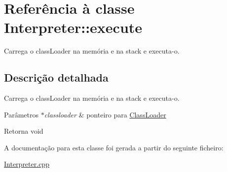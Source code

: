 \hypertarget{class_interpreter_1_1execute}{}\section{Referência à classe Interpreter\+:\+:execute}
\label{class_interpreter_1_1execute}


Carrega o class\+Loader na memória e na stack e executa-\/o.  




\subsection{Descrição detalhada}
Carrega o class\+Loader na memória e na stack e executa-\/o. 


\begin{DoxyParams}{Parâmetros}
{\em $\ast$classloader} & ponteiro para \hyperlink{class_class_loader}{Class\+Loader} \\
\hline
\end{DoxyParams}
\begin{DoxyReturn}{Retorna}
void 
\end{DoxyReturn}


A documentação para esta classe foi gerada a partir do seguinte ficheiro\+:\begin{DoxyCompactItemize}
\item 
\hyperlink{_interpreter_8cpp}{Interpreter.\+cpp}\end{DoxyCompactItemize}
